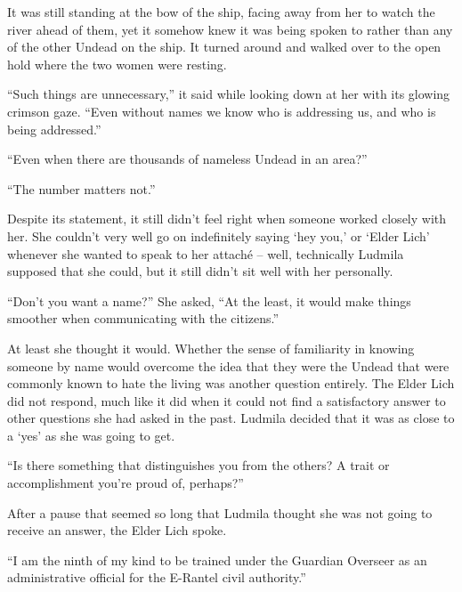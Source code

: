  

It was still standing at the bow of the ship, facing away from her to watch the river ahead of them, yet it somehow knew it was being spoken to rather than any of the other Undead on the ship. It turned around and walked over to the open hold where the two women were resting.

 

“Such things are unnecessary,” it said while looking down at her with its glowing crimson gaze. “Even without names we know who is addressing us, and who is being addressed.”

 

“Even when there are thousands of nameless Undead in an area?”

 

“The number matters not.”

 

Despite its statement, it still didn’t feel right when someone worked closely with her. She couldn’t very well go on indefinitely saying ‘hey you,’ or ‘Elder Lich’ whenever she wanted to speak to her attaché – well, technically Ludmila supposed that she could, but it still didn’t sit well with her personally.

 

“Don’t you want a name?” She asked, “At the least, it would make things smoother when communicating with the citizens.”

 

At least she thought it would. Whether the sense of familiarity in knowing someone by name would overcome the idea that they were the Undead that were commonly known to hate the living was another question entirely. The Elder Lich did not respond, much like it did when it could not find a satisfactory answer to other questions she had asked in the past. Ludmila decided that it was as close to a ‘yes’ as she was going to get.

 

“Is there something that distinguishes you from the others? A trait or accomplishment you’re proud of, perhaps?”

 

After a pause that seemed so long that Ludmila thought she was not going to receive an answer, the Elder Lich spoke.

 

“I am the ninth of my kind to be trained under the Guardian Overseer as an administrative official for the E-Rantel civil authority.”

